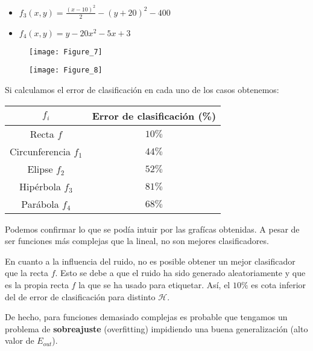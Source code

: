 \begin{multicols}{2}
\begin{itemize}
\item $f_3(x,y) = \frac{(x - 10)^2}{2} - (y + 20)^2 - 400$
\item $f_4(x,y) = y - 20x^2 - 5x + 3$
\end{itemize}
\end{multicols}

\begin{figure}[H]
  \begin{minipage}[b]{.5\linewidth}
    \centering
    \texttt{[image: Figure\_7]}
    \label{subfig-3:dummy}
  \end{minipage}
  \hfill \hfill
  \begin{minipage}[b]{.5\linewidth}
    \centering
    \texttt{[image: Figure\_8]}
    \label{subfig-4:dummy}
  \end{minipage}
  \label{fig:dummy2}
\end{figure}

Si calculamos el error de clasificación en cada uno de los casos obtenemos:

\begin{table}[!ht]
    \centering
    \begin{tabular}{cc}
    \toprule
        $f_i$ & Error de clasificación (\%) \\ \midrule
        Recta $f$            & $10\%$ \\
        Circunferencia $f_1$ & $44\%$  \\ 
        Elipse $f_2$         & $52\%$  \\
        Hipérbola $f_3$      & $81\%$  \\
        Parábola $f_4$       & $68\%$ \\ \bottomrule
    \end{tabular}
\end{table}

Podemos confirmar lo que se podía intuir por las grafícas obtenidas.
A pesar de ser funciones más complejas que la lineal, no son mejores
clasificadores. 

En cuanto a la influencia del ruido, no es posible obtener un mejor
clasificador que la recta $f$. Esto se debe a que el ruido ha sido generado
aleatoriamente y que es la propia recta $f$ la que se ha usado para
etiquetar. Así, el $10\%$ es cota inferior del de error de clasificación para
distinto $\mathcal{H}$.

De hecho, para funciones demasiado complejas es probable que tengamos
un problema de \textbf{sobreajuste} (overfitting) impidiendo una buena
generalización (alto valor de $E_{out}$).